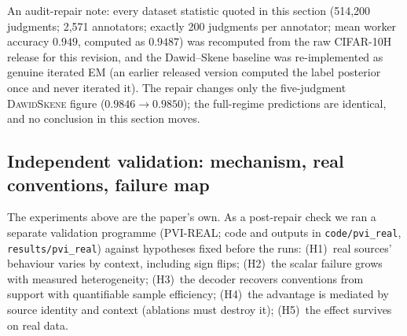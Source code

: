 An audit-repair note: every dataset statistic quoted in this section
(514,200 judgments; 2,571 annotators; exactly 200 judgments per
annotator; mean worker accuracy $0.949$, computed as $0.9487$) was
recomputed from the raw CIFAR-10H release for this revision, and the
Dawid--Skene baseline was re-implemented as genuine iterated EM (an
earlier released version computed the label posterior once and never
iterated it). The repair changes only the five-judgment
\textsc{DawidSkene} figure ($0.9846 \to 0.9850$); the full-regime
predictions are identical, and no conclusion in this section moves.

\subsection{Independent validation: mechanism, real conventions, failure map}
\label{sec:validation}

The experiments above are the paper's own. As a post-repair check we
ran a separate validation programme (PVI-REAL; code and outputs in
\texttt{code/pvi\_real}, \texttt{results/pvi\_real}) against
hypotheses fixed before the runs: (H1)~real sources' behaviour varies
by context, including sign flips; (H2)~the scalar failure grows with
measured heterogeneity; (H3)~the decoder recovers conventions from
support with quantifiable sample efficiency; (H4)~the advantage is
mediated by source identity and context (ablations must destroy it);
(H5)~the effect survives on real data.

